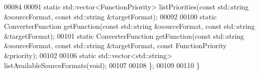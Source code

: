 \begin{DoxyCode}
00084     
00091     \textcolor{keyword}{static} std::vector<FunctionPriority> listPriorities(\textcolor{keyword}{const} std::string &sourceFormat, \textcolor{keyword}{const} 
      std::string &targetFormat);
00092     
00100     \textcolor{keyword}{static} ConverterFunction getFunction(\textcolor{keyword}{const} std::string &sourceFormat, \textcolor{keyword}{const} 
      std::string &targetFormat);
00101     \textcolor{keyword}{static} ConverterFunction getFunction(\textcolor{keyword}{const} std::string &sourceFormat, \textcolor{keyword}{const} 
      std::string &targetFormat, \textcolor{keyword}{const} FunctionPriority &priority);
00102 
00106     \textcolor{keyword}{static} std::vector<std::string> listAvailableSourceFormats(\textcolor{keywordtype}{void});
00107 
00108   \};
00109   
00110 \}
\end{DoxyCode}
